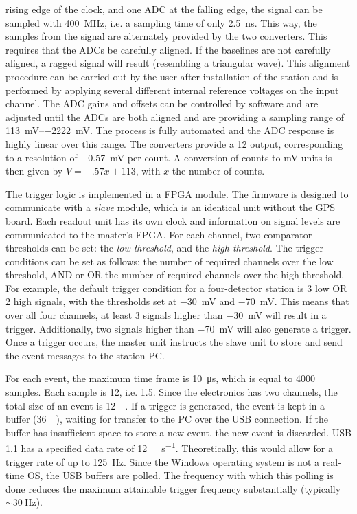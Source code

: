 rising edge of the clock, and one ADC at the falling edge, the signal can be
sampled with \SI{400}{\mega\hertz}, i.e. a sampling time of only
\SI{2.5}{\nano\second}. This way, the samples from the signal are alternately
provided by the two converters. This requires that the ADCs be carefully
aligned. If the baselines are not carefully aligned, a ragged signal will result
(resembling a triangular wave). This alignment procedure can be carried out by
the user after installation of the station and is performed by applying several
different internal reference voltages on the input channel.  The ADC gains and
offsets can be controlled by software and are adjusted until the ADCs are both
aligned and are providing a sampling range of
\SIrange[retain-explicit-plus]{+113}{-2222}{\milli\volt}. The process is fully
automated and the ADC response is highly linear over this range. The converters
provide a \SI{12}{\bit} output, corresponding to a resolution of
\SI{-.57}{\milli\volt} per \adc count.  A conversion of \adc counts to \si{\milli\volt} units is
then given by $V = -.57x + 113$, with $x$ the number of \adc counts.

The trigger logic is implemented in a FPGA module. The firmware is designed to
communicate with a \emph{slave} module, which is an identical \hisparcii
unit without the GPS board. Each readout unit has its own clock and
information on signal levels are communicated to the master's FPGA. For each
channel, two comparator thresholds can be set: the \emph{low threshold}, and the
\emph{high threshold}. The trigger conditions can be set as follows: the number
of required channels over the low threshold, AND or OR the number of required
channels over the high threshold. For example, the default trigger condition
for a four-detector station is 3 low OR 2 high signals, with the
thresholds set at \SI{-30}{\milli\volt} and \SI{-70}{\milli\volt}. This means that over all four channels, at least 3
signals higher than \SI{-30}{\milli\volt} will result in a trigger.
Additionally, two signals higher than \SI{-70}{\milli\volt} will also generate a
trigger. Once a trigger occurs, the master unit instructs the slave unit to
store and send the event messages to the station PC.

For each event, the maximum time frame is \SI{10}{\micro\second}, which is equal
to \num{4000} samples.  Each sample is \SI{12}{\bit}, i.e.
\SI{1.5}{\byte}.  Since the electronics has two channels, the total size of an
event is \SI{12}{\kilo\byte}.  If a trigger is generated, the event is kept in a
buffer (\SI{36}{\kilo\byte}),
waiting for transfer to the PC over the USB connection.  If the buffer has
insufficient space to store a new event, the new event is discarded.  USB 1.1
has a specified data rate of \SI{12}{\mega\bit\per\second}. Theoretically, this
would allow for a trigger rate of up to \SI{125}{\hertz}. Since the Windows
operating system is not a real-time OS, the USB buffers are polled. The
frequency with which this polling is done reduces the maximum attainable trigger
frequency substantially (typically $\sim \SI{30}{\hertz}$).

